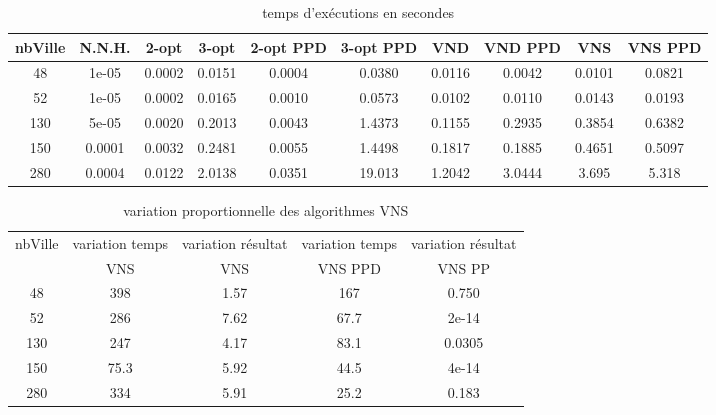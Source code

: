 \documentclass[12pt,a4paper]{article}
\begin{document}
\begin{table}[!h]
\leftskip -1.4cm
{
\begin{tabular}{|*{10}{c|}}
  \hline
  nbVille & N.N.H. & 2-opt & 3-opt & 2-opt PPD & 3-opt PPD & VND & VND PPD & VNS & VNS PPD \\
  \hline
  48 & 1e-05 & 0.0002 & 0.0151 & 0.0004 & 0.0380 & 0.0116 & 0.0042 & 0.0101 & 0.0821 \\
  52 & 1e-05 & 0.0002 & 0.0165 & 0.0010 & 0.0573 & 0.0102 & 0.0110 & 0.0143 & 0.0193 \\
  130 & 5e-05 & 0.0020 & 0.2013 & 0.0043 & 1.4373 & 0.1155 & 0.2935 & 0.3854 & 0.6382 \\
  150 & 0.0001 & 0.0032 & 0.2481 & 0.0055 & 1.4498 & 0.1817 & 0.1885 & 0.4651 & 0.5097 \\
  280 & 0.0004 & 0.0122 & 2.0138 & 0.0351 & 19.013 & 1.2042 & 3.0444 & 3.695 & 5.318 \\ 
  \hline
\end{tabular}
}
\caption{temps d’exécutions en secondes}
\label{NNHtemps}
\end{table}

\begin{table}[!h]
\centering
\begin{tabular}{|*{5}{c|}}
  \hline
  nbVille & variation temps & variation résultat & variation temps & variation résultat \\
  ~ & VNS & VNS & VNS PPD & VNS PP \\
  \hline
  48 & 398 & 1.57 & 167 & 0.750 \\ 
  52 & 286 & 7.62 & 67.7 & 2e-14 \\
  130 & 247 & 4.17 & 83.1 & 0.0305 \\
  150 & 75.3 & 5.92 & 44.5 & 4e-14 \\
  280 & 334 & 5.91 & 25.2 & 0.183 \\
  \hline
\end{tabular}
\caption{variation proportionnelle des algorithmes VNS}
\label{variationVNSNNH}
\end{table}
\end{document}
